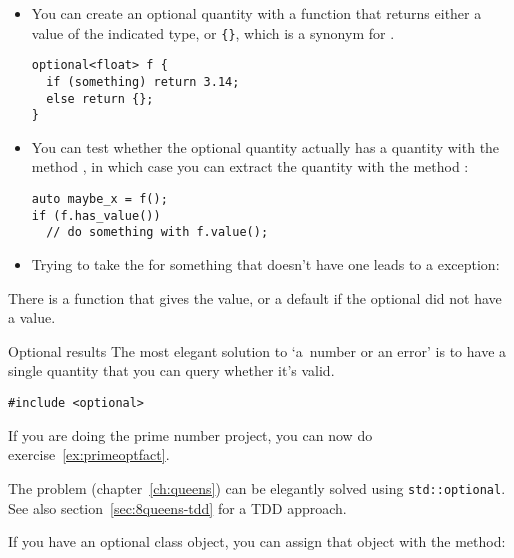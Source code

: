 \begin{itemize}
\item You can create an optional quantity with a function that returns
  either a value of the indicated type, or \verb+{}+, which is a
  synonym for .
\begin{lstlisting}
optional<float> f {
  if (something) return 3.14;
  else return {};
}
\end{lstlisting}
\item You can test whether the optional quantity actually has a quantity with
  the method ,
  in which case you can extract the quantity
  with the method :
\begin{lstlisting}
auto maybe_x = f();
if (f.has_value())
  // do something with f.value();
\end{lstlisting}
\item Trying to take the  for something that doesn't have one
  leads to a  exception:
\end{itemize}

There is a function  that gives the value, or
a default if the optional did not have a value.

\begin{slide}{Optional results}
  \label{sl:optional-root}
  The most elegant solution to `a~number or an error' is to have a
  single quantity that you can query whether it's valid.
\begin{lstlisting}
#include <optional>
\end{lstlisting}
\end{slide}

\begin{exercise}
  If you are doing the prime number project,
  you can now do exercise~\ref{ex:primeoptfact}.
\end{exercise}

\begin{exercise}
  The  problem (chapter~\ref{ch:queens})
  can be elegantly solved using \lstinline+std::optional+.
  See also section~\ref{sec:8queens-tdd} for a \ac{TDD} approach.
\end{exercise}

\begin{remark}
  If you have an optional class object, you can assign that object
  with the  method:
\end{remark}

